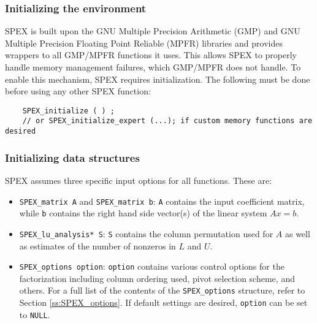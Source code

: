 \documentclass[12pt]{report}
\theoremstyle{definition}
\begin{document}
\subsubsection{Initializing the environment}

SPEX is built upon the GNU Multiple Precision Arithmetic (GMP)
\cite{granlund2015gnu} and GNU Multiple Precision Floating Point Reliable
(MPFR) \cite{fousse2007mpfr} libraries and provides wrappers to all GMP/MPFR
functions it uses.  This allows SPEX to properly handle memory management
failures, which GMP/MPFR does not handle.  To enable this mechanism, SPEX
requires initialization.  The following must be done before using any other
SPEX function:

\begin{mdframed}[userdefinedwidth=6in]
{\footnotesize
\begin{verbatim}
    SPEX_initialize ( ) ;
    // or SPEX_initialize_expert (...); if custom memory functions are desired
\end{verbatim}
} \end{mdframed}

\subsubsection{Initializing data structures}
\label{ss:init}

SPEX assumes three specific input options for all functions. These are:

\begin{itemize}
\item \verb|SPEX_matrix A| and \verb|SPEX_matrix b|: \verb|A| contains the
input coefficient matrix, while \verb|b| contains the right hand side vector(s)
of the linear system $Ax=b$.

\item \verb|SPEX_lu_analysis* S|: \verb|S| contains the column permutation used
for $A$ as well as estimates of the number of nonzeros in $L$ and $U$.

\item \verb|SPEX_options option|: \verb|option| contains various control
options for the factorization including column ordering used, pivot selection
scheme, and others. For a full list of the contents of the \verb|SPEX_options|
structure, refer to Section \ref{ss:SPEX_options}.
If default settings are desired, \verb|option| can be set to \verb|NULL|.

\end{itemize}
\end{document}
